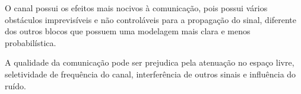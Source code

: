 \begin{subquestion}
    \item O canal possui os efeitos mais nocivos à comunicação, pois possui vários obstáculos imprevisíveis e não controláveis para a propagação do sinal, diferente dos outros blocos que possuem uma modelagem mais clara e menos probabilística. 
    \item A qualidade da comunicação pode ser prejudica pela atenuação no espaço livre, seletividade de frequência do canal, interferência de outros sinais e influência do ruído.
\end{subquestion}